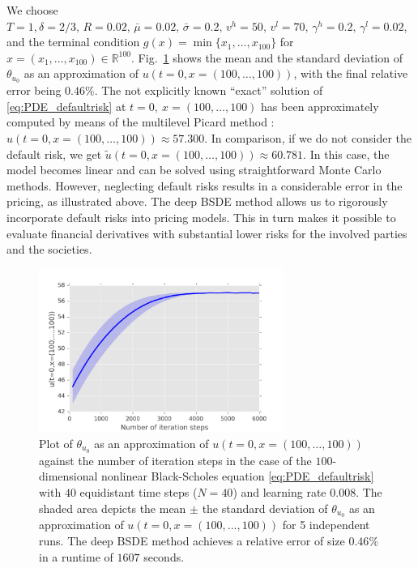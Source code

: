 \documentclass[11pt,english]{article}
\providecommand{\R}{{\ensuremath{\mathbb{R}}}}
\begin{document}
We choose $T=1, \delta = 2/3,\,R=0.02,\,\bar{\mu}=0.02,\,\bar{\sigma}=0.2,\,v^h=50,\,v^l=70,\,
\gamma^h=0.2,\,\gamma^l=0.02$, and the terminal condition $g(x)=\min\{x_1,\dots,x_{100}\}$  for $x=( x_1, \dots, x_{ 100 } ) \in \R^{ 100 }$.
Fig.\ \ref{fig:defaultrisk} shows the mean and the standard deviation of $\theta_{u_0}$ 
as an approximation of $ u(t{=}0,x{=}(100,\dots, 100))$, with the final relative error being
$ 0.46\% $.
The not explicitly known ``exact'' solution of \eqref{eq:PDE_defaultrisk} at $t=0,~x=(100,\dots, 100)$ 
has been approximately computed by means of the multilevel Picard method \cite{Weinan2016}:
$u(t{=}0, x{=}(100, \dots, 100)) \approx 57.300$. In comparison, if we do not consider the default risk, 
we get $\tilde{u}(t{=}0,x{=}(100,\dots, 100))\approx60.781$. 
In this case, the model becomes linear and can be solved using straightforward Monte Carlo
methods.
However, neglecting default risks results in a considerable error in the pricing, 
as illustrated above.
The deep BSDE method allows  us
to rigorously incorporate default risks into pricing models.  This in turn
makes it possible to
 evaluate financial derivatives with substantial lower risks for the involved parties 
and the societies.

\begin{figure}[ht]
\centering
\includegraphics[width =8cm]{PricingDefaultRisk_d100_uinit.pdf}
\caption{Plot of $\theta_{u_0}$ as an approximation
of $u(t{=}0,x{=}(100,\dots,100))$
against the number of iteration steps
in the case of the $ 100 $-dimensional nonlinear Black-Scholes equation \eqref{eq:PDE_defaultrisk} 
with $ 40 $ equidistant time steps ($ N{=}40 $) and learning rate $ 0.008 $. 
The shaded area depicts the mean $\pm$ the standard deviation of $\theta_{u_0}$ as an approximation of $u(t{=}0,x{=}(100,\dots,100))$ for 5 independent runs.
The deep BSDE method achieves a relative error of size $ 0.46\% $ in a runtime of $ 1607 $ seconds.
\label{fig:defaultrisk}}
\end{figure}
\end{document}
